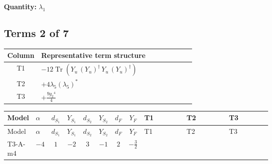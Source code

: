 \documentclass[8pt]{article}
\begin{document}
\begin{landscape}
\begin{longtable}{@{}llcccccc >{\raggedright\arraybackslash}p{0.21\linewidth} >{\raggedright\arraybackslash}p{0.21\linewidth} >{\raggedright\arraybackslash}p{0.21\linewidth}@{}}
\midrule
\bottomrule
\end{longtable}
\clearpage
\noindent\textbf{Quantity: }$\lambda_1$\par\smallskip
\subsection*{Terms 2 of 7}
\begin{center}
\begin{tabular}{@{}c >{\raggedright\arraybackslash}p{0.82\linewidth}@{}}
\toprule
Column & Representative term structure \\
\midrule
T1 & \(\displaystyle -12 \operatorname{Tr}\!\left({Y_u}\,\left({Y_u}\right)^{\dagger}\,{Y_u}\,\left({Y_u}\right)^{\dagger}\right)\) \\
\midrule
T2 & \(\displaystyle +4 {\lambda_5} \left({\lambda_5}\right)^{*}\) \\
\midrule
T3 & \(\displaystyle +\frac{9 {g_2}^4}{4}\) \\
\midrule
\bottomrule
\end{tabular}
\end{center}
\smallskip
\tiny
\begin{longtable}{@{}llcccccc >{\raggedright\arraybackslash}p{0.21\linewidth} >{\raggedright\arraybackslash}p{0.21\linewidth} >{\raggedright\arraybackslash}p{0.21\linewidth}@{}}
\toprule
Model & $\alpha$ & $d_{S_1}$ & $Y_{S_1}$ & $d_{S_2}$ & $Y_{S_2}$ & $d_F$ & $Y_F$ & T1 & T2 & T3 \\
\midrule
\endfirsthead
\toprule
Model & $\alpha$ & $d_{S_1}$ & $Y_{S_1}$ & $d_{S_2}$ & $Y_{S_2}$ & $d_F$ & $Y_F$ & T1 & T2 & T3 \\
\midrule
\endhead
T3-A-m4 & $-4$ & $1$ & $-2$ & $3$ & $-1$ & $2$ & $-\frac{3}{2}$ & \scriptsize\adjustbox{max width=\linewidth}{$\begin{gathered} -12 \operatorname{Tr}\!\left({Y_u}\,\left({Y_u}\right)^{\dagger}\,{Y_u}\,\left({Y_u}\right)^{\dagger}\right)\end{gathered}$} & \scriptsize\adjustbox{max width=\linewidth}{$\begin{gathered} +4 {\lambda_5} \left({\lambda_5}\right)^{*}\end{gathered}$} & \scriptsize\adjustbox{max width=\linewidth}{$\begin{gathered} +\frac{9 {g_2}^4}{4}\end{gathered}$} \\
\midrule

\end{longtable}
\end{landscape}
\end{document}
